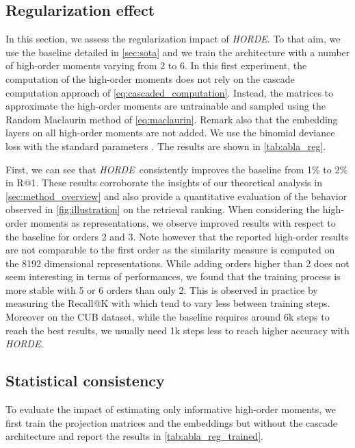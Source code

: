 \documentclass[10pt,twocolumn,letterpaper]{article}
\def\ourmethod{\textit{HORDE}}
\begin{document}
    \subsection{Regularization effect}\label{sec:abla_regul_power}
        In this section, we assess the regularization impact of \ourmethod.
        To that aim, we use the baseline detailed in \autoref{sec:sota} and we train the architecture with a number of high-order moments varying from 2 to 6.
        In this first experiment, the computation of the high-order moments does not rely on the cascade computation approach of \autoref{eq:cascaded_computation}.
        Instead, the matrices to approximate the high-order moments are untrainable and sampled using the Random Maclaurin method of \autoref{eq:maclaurin}.
        Remark also that the embedding layers on all high-order moments are not added.
        We use the binomial deviance loss with the standard parameters \cite{Ustinova_2016_NIPS}.
        The results are shown in \autoref{tab:abla_reg}.
        
        First, we can see that \ourmethod \ consistently improves the baseline from 1\% to 2\% in R@1.
        These results corroborate the insights of our theoretical analysis in \autoref{sec:method_overview} and also provide a quantitative evaluation of the behavior observed in \autoref{fig:illustration} on the retrieval ranking.
        When considering the high-order moments as representations, we observe improved results with respect to the baseline for orders 2 and 3.
        Note however that the reported high-order results are not comparable to the first order as the similarity measure is computed on the 8192 dimensional representations.
        While adding orders higher than 2 does not seem interesting in terms of performances, we found that the training process is more stable with 5 or 6 orders than only 2.
        This is observed in practice by measuring the Recall@K with  which tend to vary less between training steps.
        Moreover on the CUB dataset, while the baseline requires around 6k steps to reach the best results, we usually need 1k steps less to reach higher accuracy with \ourmethod.
    
    \subsection{Statistical consistency}\label{sec:abla_statistical_consistency}
        To evaluate the impact of estimating only informative high-order moments, we first train the projection matrices and the embeddings but without the cascade architecture and report the results in \autoref{tab:abla_reg_trained}.
        
\end{document}
